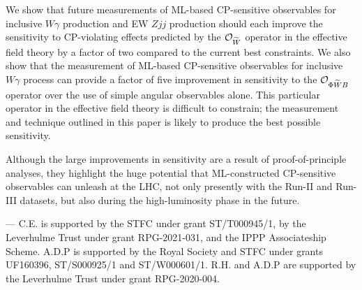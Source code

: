 \documentclass[twocolumn,preprintnumbers,superscriptaddress,nofootinbib,aps,prd,floatfix]{revtex4}
\begin{document}
We show that future measurements of ML-based CP-sensitive observables for inclusive $W\gamma$ production and EW $Zjj$ production should each improve the sensitivity to CP-violating effects predicted by the  ${\cal{O}}_{\widetilde{W}}$ operator in the effective field theory by a factor of two compared to the current best constraints. We also show that the measurement of ML-based CP-sensitive observables for inclusive $W\gamma$ process can provide a factor of five improvement in sensitivity to the ${\cal{O}}_{\Phi \widetilde{W}B}$ operator over the use of simple angular observables alone. This particular operator in the effective field theory is difficult to constrain; the measurement and technique outlined in this paper is likely to produce the best possible sensitivity.

Although the large improvements in sensitivity are a result of proof-of-principle analyses, they highlight the huge potential that ML-constructed CP-sensitive observables can unleash at the LHC, not only presently with the Run-II and Run-III datasets, but also during the high-luminosity phase in the future.


\bigskip
{} ---
%
C.E. is supported by the STFC under grant ST/T000945/1, by the Leverhulme Trust under grant RPG-2021-031, and the IPPP Associateship Scheme. A.D.P is supported by the Royal Society and STFC under grants UF160396, ST/S000925/1 and ST/W000601/1. R.H. and A.D.P are supported by the Leverhulme Trust under grant RPG-2020-004.


%
% 
 
\end{document}
